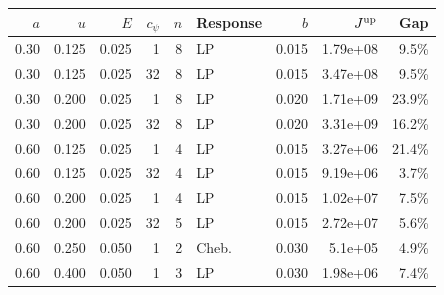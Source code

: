\begin{tabular}{rrrrrlrrr}
\toprule
$a$ & $u$ & $E$ & $c_\psi$ & $n$ & Response & $b$ & $J^{\rm up}$ & Gap \\
\midrule
0.30 & 0.125 & 0.025 & 1 & 8 & LP & 0.015 & 1.79e+08 & 9.5\% \\
0.30 & 0.125 & 0.025 & 32 & 8 & LP & 0.015 & 3.47e+08 & 9.5\% \\
0.30 & 0.200 & 0.025 & 1 & 8 & LP & 0.020 & 1.71e+09 & 23.9\% \\
0.30 & 0.200 & 0.025 & 32 & 8 & LP & 0.020 & 3.31e+09 & 16.2\% \\
0.60 & 0.125 & 0.025 & 1 & 4 & LP & 0.015 & 3.27e+06 & 21.4\% \\
0.60 & 0.125 & 0.025 & 32 & 4 & LP & 0.015 & 9.19e+06 & 3.7\% \\
0.60 & 0.200 & 0.025 & 1 & 4 & LP & 0.015 & 1.02e+07 & 7.5\% \\
0.60 & 0.200 & 0.025 & 32 & 5 & LP & 0.015 & 2.72e+07 & 5.6\% \\
0.60 & 0.250 & 0.050 & 1 & 2 & Cheb. & 0.030 & 5.1e+05 & 4.9\% \\
0.60 & 0.400 & 0.050 & 1 & 3 & LP & 0.030 & 1.98e+06 & 7.4\% \\
\bottomrule
\end{tabular}
